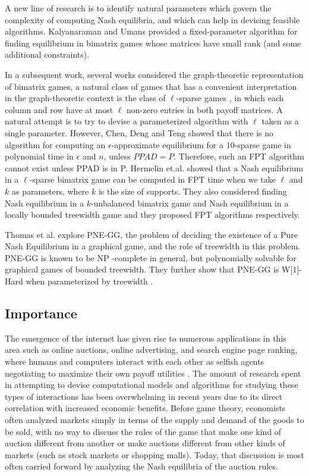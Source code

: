 \documentclass{article}
\begin{document}
A new line of research is to identify natural parameters which govern the complexity of computing Nash equilibria, and which can help in devising feasible algorithms. Kalyanaraman and Umans \cite{kalyanaraman2007algorithms} provided a fixed-parameter algorithm for finding equilibrium in bimatrix games whose matrices have small rank (and some additional constraints).

In a subsequent work, several works \cite{hermelin2013parameterized,codenotti2006efficient,addario2007polynomial} considered the graph-theoretic representation of bimatrix games, a natural class of games that has a convenient interpretation in the graph-theoretic context is the class of \(\ell\)-sparse games \cite{chen2006sparse,codenotti2006efficient,daskalakis2009oblivious}, in which each column and row have at most \(\ell\) non-zero entries in both payoff matrices. A natural attempt is to try to devise a parameterized algorithm with \(\ell\) taken as a single parameter. However, Chen, Deng and Teng \cite{chen2006sparse} showed that there is no algorithm for computing an \(\epsilon\)-approximate equilibrium for a 10-sparse game in polynomial time in \(\epsilon\) and \(n\), unless \(PPAD=P\). Therefore, such an FPT algorithm cannot exist unless PPAD is in P. Hermelin et.al.\cite{hermelin2013parameterized} showed that a Nash equilibrium in a \(\ell\)-sparse bimatrix game can be computed in FPT time when we take \(\ell\) and \(k\) as parameters, where \(k\) is the size of supports. They also considered finding Nash equilibrium in a \(k\)-unbalanced bimatrix game and Nash equilibrium in a locally bounded treewidth game and they proposed FPT algorithms respectively. 

Thomas et al. explore PNE-GG, the problem of deciding the existence of a Pure Nash Equilibrium in a graphical game, and the role of treewidth in this problem. PNE-GG is known to be NP -complete in general, but polynomially solvable for graphical games of bounded treewidth. They further show that PNE-GG is   W[1]-Hard when parameterized by treewidth \cite{thomas2015pure}.

\subsection*{Importance}
The emergence of the internet has given rise to numerous applications in this area such as online
auctions, online advertising, and search engine page ranking, where humans and computers interact with each other as selfish agents negotiating to maximize their own payoff utilities \cite{hermelin2013parameterized}. The amount of research spent in attempting to devise computational models and algorithms for studying these types of interactions has been overwhelming in recent years due to its direct correlation with increased economic benefits. Before game theory, economists often analyzed markets simply in terms of the supply and demand of the goods to be sold, with no way to discuss the rules of the game that make one kind of auction different from another or make auctions different from other kinds of markets (such as stock markets or shopping malls). Today, that discussion is most often carried forward by analyzing the Nash equilibria of the auction rules.
\medskip



\end{document}
